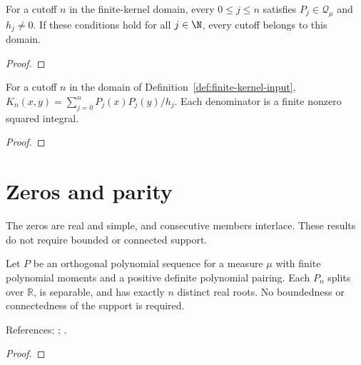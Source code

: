 \begin{supporting}
\begin{theorem}
\label{thm:finite-kernel-input}
\leanok
For a cutoff $n$ in the finite-kernel domain, every $0\le j\le n$
satisfies $P_j\in\mathcal Q_\mu$ and $h_j\ne0$.
If these conditions hold for all $j\in\N$, every cutoff belongs to this domain.
\end{theorem}
\begin{proof}
\leanok
\end{proof}

\begin{theorem}
\label{thm:finite-kernel-characterisation}
\leanok
For a cutoff $n$ in the domain of Definition~\ref{def:finite-kernel-input},
$K_n(x,y)=\sum_{j=0}^n P_j(x)P_j(y)/h_j$.
Each denominator is a finite nonzero squared integral.
\end{theorem}
\begin{proof}
\leanok
\end{proof}

\end{supporting}

\section{Zeros and parity}\label{sec:textbook-general-zeros}

The zeros are real and simple, and consecutive members interlace. These results do not require bounded or connected support.

\begin{theorem}
\label{thm:general-real-zeros}
\leanok
Let $P$ be an orthogonal polynomial sequence for a measure $\mu$ with finite polynomial moments and a positive definite polynomial pairing.
Each $P_n$ splits over $\mathbb R$, is separable, and has exactly $n$ distinct
real roots. No boundedness or connectedness of the support is required.

References: \cite[18.2(vi)]{dlmf}; \cite[Chapter 3]{szego}.
\end{theorem}
\begin{proof}
\leanok
\end{proof}

